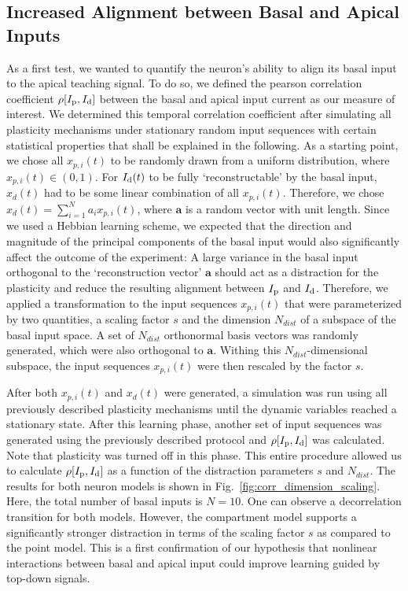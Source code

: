 \documentclass[utf8]{frontiersSCNS} %
\begin{document}
\subsection{Increased Alignment between Basal and Apical Inputs}
\label{sect:alignment}

As a first test, we wanted to quantify the neuron's ability to 
align its basal input to the apical teaching signal.
To do so, we defined the pearson correlation coefficient
$\rho[I_{\rm p},I_{\rm d}]$ between the basal and apical input current
as our measure of interest. We determined this temporal
correlation coefficient after simulating all plasticity mechanisms
under stationary random input sequences with certain statistical
properties that shall be explained in the following.
As a starting point, we chose all $x_{p,i}(t)$ to be randomly
drawn from a uniform distribution, where $x_{p,i}(t) \in (0,1)$.
For $I_{\rm d}(t)$ to be fully `reconstructable' by the basal input, 
$x_d(t)$ had to be some linear combination of all $x_{p,i}(t)$.
Therefore, we chose $x_d(t) = \sum_{i=1}^N a_i x_{p,i}(t)$, where
$\mathbf{a}$ is a random vector with unit length.
Since we used a Hebbian learning scheme, we expected that 
the direction and magnitude of the principal components of 
the basal input would also significantly affect the outcome of
the experiment: A large variance in the basal input 
orthogonal to the `reconstruction vector' $\mathbf{a}$ 
should act as a distraction for the plasticity and reduce the
resulting alignment between $I_{\rm p}$ and $I_{\rm d}$. Therefore, we 
applied a transformation to the input sequences $x_{p,i}(t)$
that were parameterized by two quantities, a scaling factor $s$
and the dimension $N_{dist}$ of a subspace of the basal input space.
A set of $N_{dist}$ orthonormal basis vectors was randomly generated,
which were also orthogonal to $\mathbf{a}$. 
Withing this $N_{dist}$-dimensional subspace, the input sequences 
$x_{p,i}(t)$ were then rescaled by the factor $s$. 

After both $x_{p,i}(t)$ and $x_d(t)$ were generated,
a simulation was run using all previously described plasticity
mechanisms until the dynamic variables reached a stationary state.
After this learning phase, another set of input sequences was generated
using the previously described protocol and $\rho[I_{\rm p},I_{\rm d}]$ 
was calculated. Note that plasticity was turned off in this phase. 
This entire procedure allowed us to calculate $\rho[I_{\rm p},I_{\rm d}]$ 
as a function of the distraction parameters $s$ and $N_{dist}$. 
The results for both neuron models is shown in 
Fig.~\ref{fig:corr_dimension_scaling}. Here, the total number of 
basal inputs is $N=10$. One can observe a decorrelation transition for 
both models. However, the compartment model supports a 
significantly stronger distraction in terms of the scaling 
factor $s$ as compared to the point model. This is a first confirmation 
of our hypothesis that nonlinear interactions between basal and 
apical input could improve learning guided by top-down signals.
\end{document}
